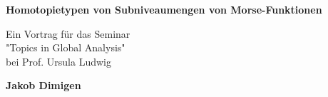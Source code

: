 \documentclass[a4paper,11pt]{article}
\begin{document}
\begin{titlepage}
    \begin{center}
        \vspace*{1cm}
 
        \Large{\textbf{Homotopietypen von Subniveaumengen von Morse-Funktionen}}
 
        \vspace{0.5cm}
        Ein Vortrag für das Seminar \\ 
        "Topics in Global Analysis" \\
        bei Prof. Ursula Ludwig
             
        \vspace{1.5cm}
 
        \textbf{Jakob Dimigen}
             
    \end{center}
\end{titlepage}








\end{document}
